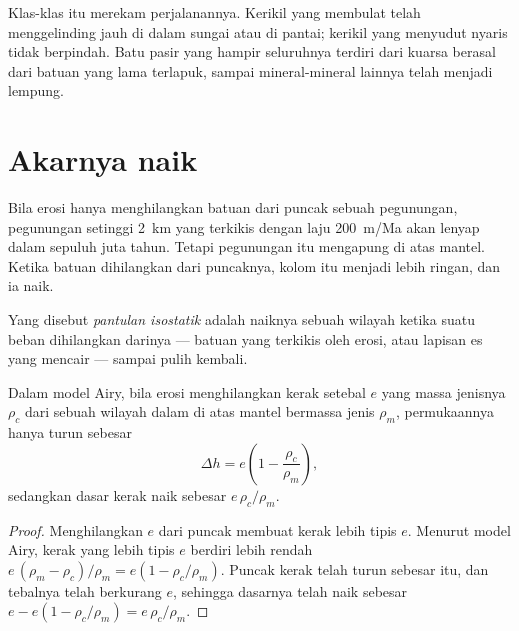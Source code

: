 Klas-klas itu merekam perjalanannya. Kerikil yang membulat telah menggelinding
jauh di dalam sungai atau di pantai; kerikil yang menyudut nyaris tidak
berpindah. Batu pasir yang hampir seluruhnya terdiri dari kuarsa berasal dari
batuan yang lama terlapuk, sampai mineral-mineral lainnya telah menjadi lempung.

\section{Akarnya naik}

Bila erosi hanya menghilangkan batuan dari puncak sebuah pegunungan, pegunungan
setinggi \qty{2}{km} yang terkikis dengan laju \qty{200}{m/Ma} akan lenyap
dalam sepuluh juta tahun. Tetapi pegunungan itu mengapung di atas mantel.
Ketika batuan dihilangkan dari puncaknya, kolom itu menjadi lebih ringan, dan
ia naik.

\begin{definition}\label{def:g12:destruction-of-mountains:rebound}
Yang disebut \emph{pantulan isostatik} adalah naiknya
sebuah wilayah  ketika suatu beban dihilangkan darinya --- batuan yang
terkikis oleh erosi, atau lapisan es yang mencair --- sampai  pulih
kembali.
\end{definition}

\begin{proposition}\label{prop:g12:destruction-of-mountains:rebound}
Dalam model Airy, bila erosi menghilangkan kerak setebal $e$ yang massa jenisnya
$\rho_c$ dari sebuah wilayah dalam  di atas mantel bermassa jenis
$\rho_m$, permukaannya hanya turun sebesar
\[
  \Delta h = e\left(1 - \frac{\rho_c}{\rho_m}\right),
\]
sedangkan dasar kerak naik sebesar $e\,\rho_c/\rho_m$.
\end{proposition}

\begin{proof}
Menghilangkan $e$ dari puncak membuat kerak lebih tipis $e$. Menurut model
Airy, kerak yang lebih tipis $e$ berdiri lebih rendah $e\,(\rho_m - \rho_c)/\rho_m = e(1 -
\rho_c/\rho_m)$. Puncak kerak telah turun sebesar itu, dan tebalnya telah
berkurang $e$, sehingga dasarnya telah naik sebesar $e - e(1 -
\rho_c/\rho_m) = e\,\rho_c/\rho_m$.
\end{proof}

